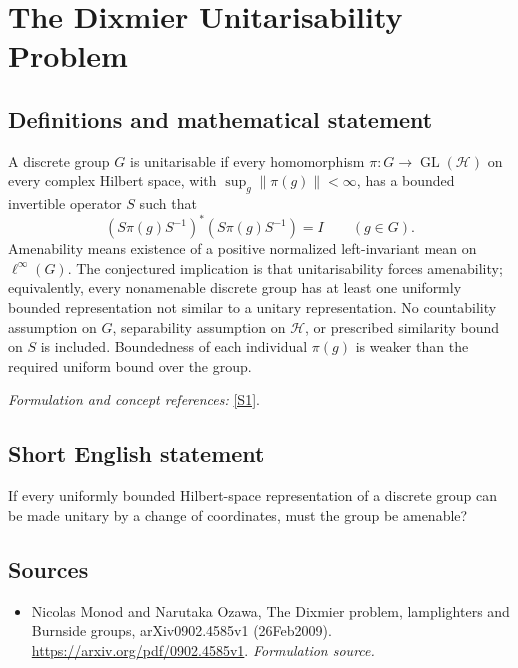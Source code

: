 \documentclass[11pt]{article}
\begin{document}
\section*{\texorpdfstring{The Dixmier Unitarisability Problem}{The Dixmier Unitarisability Problem}}\label{30004208}
\subsection{Definitions and mathematical statement}
A discrete group $G$ is unitarisable if every homomorphism $\pi:G\to\operatorname{GL}(\mathcal H)$ on every complex Hilbert space, with $\sup_g\|\pi(g)\|<\infty$, has a bounded invertible operator $S$ such that
\[
 (S\pi(g)S^{-1})^*(S\pi(g)S^{-1})=I\qquad(g\in G).
\]
Amenability means existence of a positive normalized left-invariant mean on $\ell^\infty(G)$. The conjectured implication is that unitarisability forces amenability; equivalently, every nonamenable discrete group has at least one uniformly bounded representation not similar to a unitary representation. No countability assumption on $G$, separability assumption on $\mathcal H$, or prescribed similarity bound on $S$ is included. Boundedness of each individual $\pi(g)$ is weaker than the required uniform bound over the group.
\par\smallskip\textit{Formulation and concept references:} \href{https://arxiv.org/pdf/0902.4585v1}{[S1]}.

\subsection{Short English statement}
If every uniformly bounded Hilbert-space representation of a discrete group can be made unitary by a change of coordinates, must the group be amenable?
\subsection{Sources}
\begin{itemize}
\item[S1]Nicolas Monod and Narutaka Ozawa, The Dixmier problem, lamplighters and Burnside groups, arXiv0902.4585v1 (26Feb2009).
\url{https://arxiv.org/pdf/0902.4585v1}.
\textit{Formulation source.}
\end{itemize}
\end{document}
